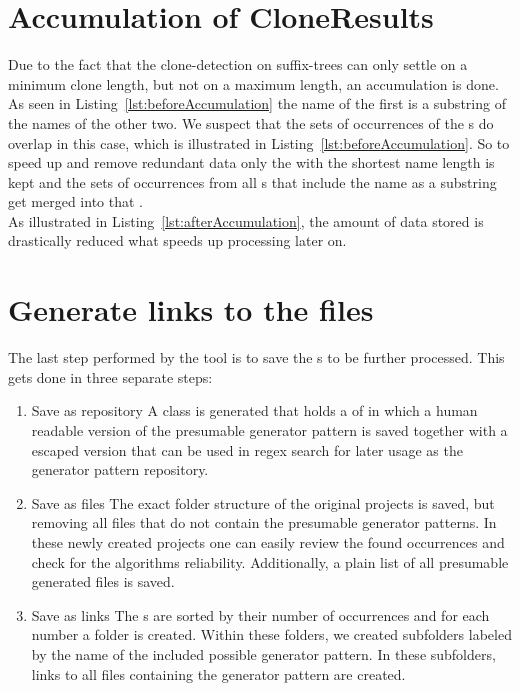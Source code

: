\section{Accumulation of CloneResults}
Due to the fact that the clone-detection on suffix-trees can only settle on a minimum clone length, but not on a maximum length, an accumulation is done.\\
As seen in Listing~\ref{lst:beforeAccumulation} the name of the first  is a substring of the names of the other two. We suspect that the sets of occurrences of the s do overlap in this case, which is illustrated in Listing~\ref{lst:beforeAccumulation}. So to speed up and remove redundant data only the  with the shortest name length is kept and the sets of occurrences from all s that include the name as a substring get merged into that .\\
As illustrated in Listing~\ref{lst:afterAccumulation}, the amount of data stored is drastically reduced what speeds up processing later on.



\section{Generate links to the files}
The last step performed by the tool is to save the s to be further processed. This gets done in three separate steps:
\begin{enumerate}
	\item Save as repository
		\subitem A  class is generated that holds a  of  in which a human readable version of the presumable generator pattern is saved together with a escaped version that can be used in regex search for later usage as the generator pattern repository.
	\item Save as files
		\subitem The exact folder structure of the original projects is saved, but removing all files that do not contain the presumable generator patterns. In these newly created projects one can easily review the found occurrences and check for the algorithms reliability. Additionally, a plain  list of all presumable generated files is saved.
	\item Save as links
		\subitem The s are sorted by their number of occurrences and for each number a folder is created. Within these folders, we created subfolders labeled by the name of the included possible generator pattern. In these subfolders, links to all files containing the generator pattern are created.
\end{enumerate} 

